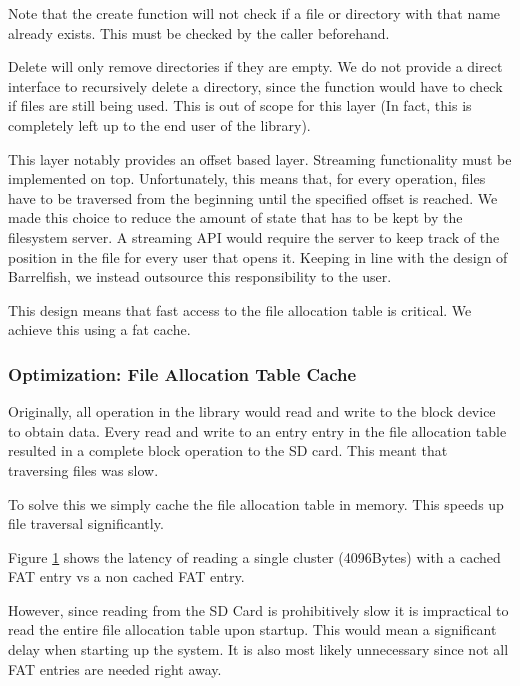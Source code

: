 Note that the create function will not check if a file or directory with that name already exists.
This must be checked by the caller beforehand.

Delete will only remove directories if they are empty.
We do not provide a direct interface to recursively delete a directory, since the function would have to check if files are still being used.
This is out of scope for this layer (In fact, this is completely left up to the end user of the library).

This layer notably provides an offset based layer.
Streaming functionality must be implemented on top.
Unfortunately, this means that, for every operation, files have to be traversed from the beginning until the specified offset is reached.
We made this choice to reduce the amount of state that has to be kept by the filesystem server.
A streaming API would require the server to keep track of the position in the file for every user that opens it.
Keeping in line with the design of Barrelfish, we instead outsource this responsibility to the user.

This design means that fast access to the file allocation table is critical.
We achieve this using a fat cache.

\subsubsection{Optimization: File Allocation Table Cache}
Originally, all operation in the library would read and write to the block device to obtain data.
Every read and write to an entry entry in the file allocation table resulted in a complete block operation to the SD card.
This meant that traversing files was slow.

To solve this we simply cache the file allocation table in memory.
This speeds up file traversal significantly. 

Figure \ref{fig:fs_read_one} shows the latency of reading a single cluster (4096Bytes) with a cached FAT entry vs a non cached FAT entry.


\begin{figure}[ht]
    \centering
    \scalebox{0.6}{ }
    \caption{}
    \label{fig:fs_read_one}
\end{figure}


However, since reading from the SD Card is prohibitively slow it is impractical to read the entire file allocation table upon startup.
This would mean a significant delay when starting up the system.
It is also most likely unnecessary since not all FAT entries are needed right away. 

